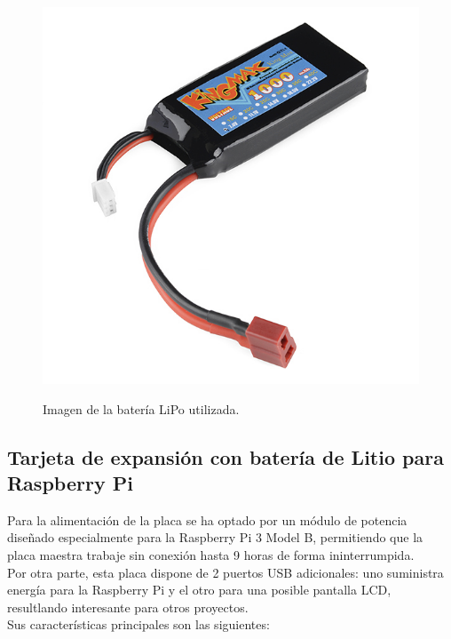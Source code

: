 \begin{figure}[H]
  \begin{center}
    \includegraphics[scale=0.3]{imagenes/robot/bateria-lipo.jpg}\\
    \caption{Imagen de la batería LiPo utilizada.}
  \end{center}
\end{figure}


\subsection{ Tarjeta de expansión con batería de Litio para Raspberry Pi }
\label{componente:bateria-expansion}

Para la alimentación de la placa se ha optado por un módulo de potencia diseñado especialmente para la Raspberry Pi 3 Model B, permitiendo que la placa maestra trabaje sin conexión hasta 9 horas
de forma ininterrumpida.\\

Por otra parte, esta placa dispone de 2 puertos USB adicionales: uno suministra energía para la Raspberry Pi y el otro para una posible pantalla LCD, resultlando interesante para otros proyectos.\\

Sus características principales son las siguientes:


